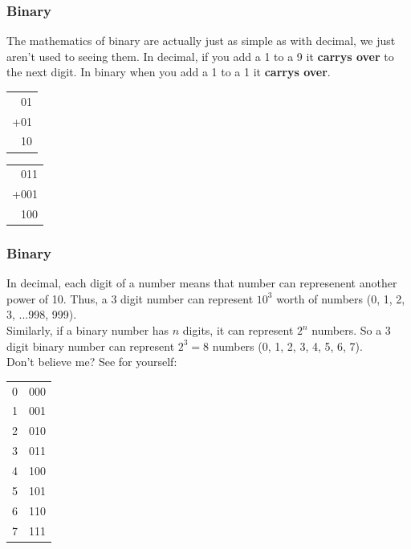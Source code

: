 \documentclass{beamer}
\begin{document}
\begin{frame}
  \frametitle{Binary}
  The mathematics of binary are actually just as simple as 
  with decimal, we just aren't used to seeing them.
  In decimal, if you add a 1 to a 9 it \textbf{carrys over} 
  to the next digit. In binary when you add a 1 to a 1 
  it \textbf{carrys over}.\\
  \begin{center}
    \begin{tabular}{r}
      01\\
      +01\\
      \hline
      10\\
    \end{tabular}
  \end{center}
  \begin{center}
    \begin{tabular}{r}
      011\\
      +001\\
      \hline
      100\\
    \end{tabular}
  \end{center}
\end{frame}

\begin{frame}
  \frametitle{Binary}
  In decimal, each digit of a number means 
  that number can represenent another power of 10.
  Thus, a 3 digit number can represent $10^3$ worth
  of numbers (0, 1, 2, 3, ...998, 999).\\
  \vspace{12pt}
  Similarly, if a binary number has $n$ digits, it can
  represent $2^n$ numbers. So a 3 digit binary number
  can represent $2^3 = 8$ numbers (0, 1, 2, 3, 4, 5, 6, 7).\\
  Don't believe me? See for yourself:\\
  \begin{center}
    \begin{tabular}{ll}
      0 & 000\\
      1 & 001\\
      2 & 010\\
      3 & 011\\
      4 & 100\\
      5 & 101\\
      6 & 110\\
      7 & 111\\
    \end{tabular}
  \end{center}
\end{frame}
\end{document}
